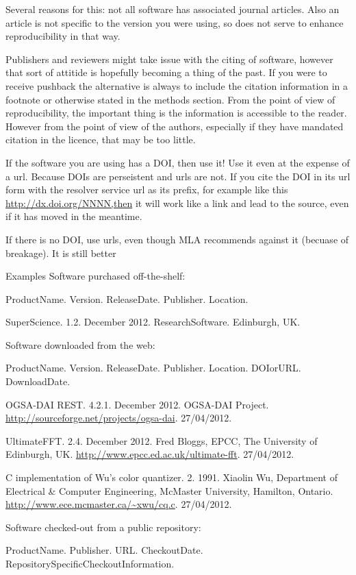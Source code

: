 \documentclass[]{article}
\begin{document}
Several reasons for this: not all software has associated journal
articles. Also an article is not specific to the version you were using,
so does not serve to enhance reproducibility in that way.

Publishers and reviewers might take issue with the citing of software,
however that sort of attitide is hopefully becoming a thing of the past.
If you were to receive pushback the alternative is always to include the
citation information in a footnote or otherwise stated in the methods
section. From the point of view of reproducibility, the important thing
is the information is accessible to the reader. However from the point
of view of the authors, especially if they have mandated citation in the
licence, that may be too little.

If the software you are using has a DOI, then use it! Use it even at the
expense of a url. Because DOIs are perseistent and urls are not. If you
cite the DOI in its url form with the resolver service url as its
prefix, for example like this \url{http://dx.doi.org/NNNN,then} it will
work like a link and lead to the source, even if it has moved in the
meantime.

If there is no DOI, use urls, even though MLA recommends against it
(becuase of breakage). It is still better

Examples Software purchased off-the-shelf:

ProductName. Version. ReleaseDate. Publisher. Location.

SuperScience. 1.2. December 2012. ResearchSoftware. Edinburgh, UK.

Software downloaded from the web:

ProductName. Version. ReleaseDate. Publisher. Location. DOIorURL.
DownloadDate.

OGSA-DAI REST. 4.2.1. December 2012. OGSA-DAI Project.
\url{http://sourceforge.net/projects/ogsa-dai}. 27/04/2012.

UltimateFFT. 2.4. December 2012. Fred Bloggs, EPCC, The University of
Edinburgh, UK. \url{http://www.epcc.ed.ac.uk/ultimate-fft}. 27/04/2012.

C implementation of Wu's color quantizer. 2. 1991. Xiaolin Wu,
Department of Electrical \& Computer Engineering, McMaster University,
Hamilton, Ontario. \url{http://www.ece.mcmaster.ca/~xwu/cq.c}.
27/04/2012.

Software checked-out from a public repository:

ProductName. Publisher. URL. CheckoutDate.
RepositorySpecificCheckoutInformation.
\end{document}
